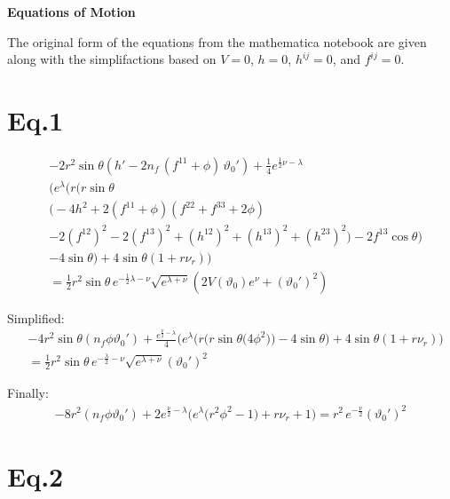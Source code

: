 \documentclass[12pt]{article}
\begin{document}
\begin{center}
  \Large\textbf{Equations of Motion} \\
  \large{}
\end{center}

The original form of the equations from the mathematica notebook are given along with the simplifactions based on $V=0$, $h=0$, $h^{ij}=0$, and $f^{ij}=0$.

\section*{Eq.1}

\begin{align*}
& -2r^2 \sin\theta \left( h' - 2n_f \,(f^{11} + \phi)\, \vartheta_0' \right)
+\tfrac{1}{4} e^{\frac{1}{2}\nu - \lambda}
\\ &\Big(
 e^{\lambda} \big(
   r \big(
     r \sin\theta \\ &\big(
       -4h^2 
       + 2(f^{11} + \phi)(f^{22} + f^{33} + 2\phi) \\
       &- 2(f^{12})^2 - 2(f^{13})^2 
       + (h^{12})^2 + (h^{13})^2 + (h^{23})^2
     \big)
     - 2 f^{13} \cos\theta
   \big) \\
   &- 4\sin\theta
 \big)
 + 4\sin\theta \left(1 + r \nu_{r}\right)
\Big) \nonumber \\
&= \tfrac{1}{2} r^2 \sin\theta\, e^{-\frac{1}{2}\lambda - \nu}
  \sqrt{e^{\lambda + \nu}}
  \left( 2V(\vartheta_0)e^{\nu} + (\vartheta_0')^2 \right)
\end{align*}

Simplified:
\begin{align*}
& -4r^2 \sin\theta \left(n_f\phi\vartheta_0' \right)
+\tfrac{e^{\frac{\nu}{2} - \lambda}}{4}
\Big(
 e^{\lambda} \big(
   r \big(
     r \sin\theta \big(
       4\phi^2\big)
   \big)
   - 4\sin\theta
 \big)
 + 4\sin\theta \left(1 + r \nu_{r}\right)
\Big) \\
&= \tfrac{1}{2} r^2 \sin\theta\, e^{-\frac{\lambda}{2} - \nu}
  \sqrt{e^{\lambda + \nu}} (\vartheta_0')^2
\end{align*}

Finally:
\begin{align*}
-8r^2 \left(n_f\phi\vartheta_0' \right)
+2e^{\frac{\nu}{2} - \lambda}
\Big( e^{\lambda} \big(r^2\phi^2 - 1 \big) + r\nu_{r} + 1\Big)
= r^2 \, e^{-\frac{\nu}{2}}(\vartheta_0')^2
\end{align*}

\section*{Eq.2}
\end{document}
